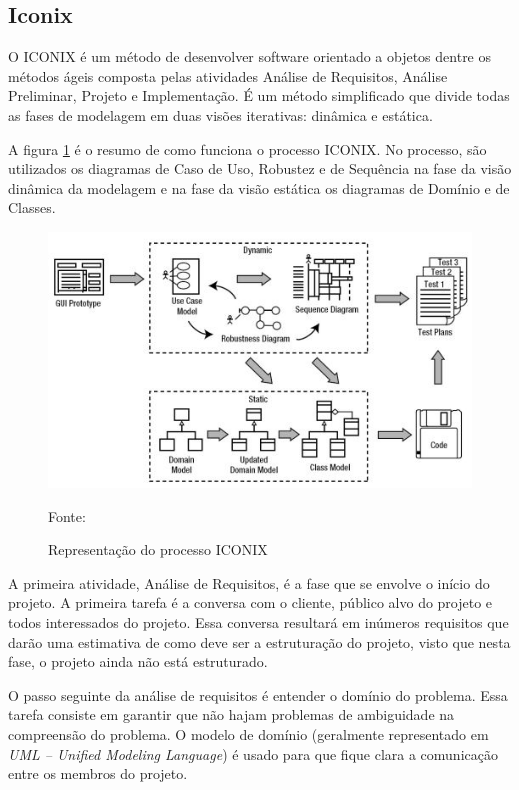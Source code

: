 \subsection{Iconix}
O ICONIX \cite{iconixuml} é um método de desenvolver software orientado a objetos dentre os métodos ágeis composta pelas atividades Análise de Requisitos, Análise Preliminar, Projeto e Implementação. É um método simplificado que divide todas as fases de modelagem em duas visões iterativas: dinâmica e estática.

A figura \ref{iconix-img}   é o resumo de como funciona o processo ICONIX. No processo, são utilizados os diagramas de Caso de Uso, Robustez e de Sequência na fase da visão dinâmica da modelagem e na fase da visão estática os diagramas de Domínio e de Classes.

\begin{figure}[H]
  \centering
  \caption{Representação do processo ICONIX}
 \includegraphics[scale=0.7]{imagens/iconix.jpg} \par
\bigskip
\label{iconix-img}
   Fonte: \cite[p. 1]{iconixuml}
\end{figure}

A primeira atividade, Análise de Requisitos, é a fase que se envolve o início do projeto. A primeira tarefa é a conversa com o cliente, público alvo do projeto e todos interessados do projeto. Essa conversa resultará em inúmeros requisitos que darão uma estimativa de como deve ser a estruturação do projeto, visto que nesta fase, o projeto ainda não está estruturado.

O passo seguinte da análise de requisitos é entender o domínio do problema. Essa tarefa consiste em garantir que não hajam problemas de ambiguidade na compreensão do problema. O modelo de domínio (geralmente representado em \emph{UML -- Unified Modeling Language}) é usado para que fique clara a comunicação entre os membros do projeto.

